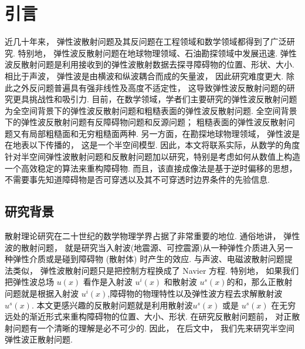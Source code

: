 \chapter{引言}\label{chap:introduction}
近几十年来， 弹性波散射问题及其反问题在工程领域和数学领域都得到了广泛研究\cite{landau}.  特别地， 弹性波反散射问题在地球物理领域、石油勘探领域中发展迅速. 
弹性波反散射问题是利用接收到的弹性波散射数据去探寻障碍物的位置、形状、大小.  相比于声波， 弹性波是由横波和纵波耦合而成的矢量波， 因此研究难度更大.  除此之外反问题普遍具有强非线性及高度不适定性， 这导致弹性波反散射问题的研究更具挑战性和吸引力. 目前，在数学领域，学者们主要研究的弹性波反散射问题为全空间背景下的弹性波反散射问题\cite{bonnet2005inverse,bao2018inverse}和粗糙表面的弹性波反散射问题\cite{liu2019near}.  全空间背景下的弹性波反散射问题有反障碍物问题和反源问题； 粗糙表面的弹性波反散射问题又有局部粗糙面和无穷粗糙面两种. 另一方面，在勘探地球物理领域， 弹性波是在地表以下传播的， 这是一个半空间模型. 因此，本文将联系实际，从数学的角度针对半空间弹性波散射问题和反散射问题加以研究，特别是考虑如何从数值上构造一个高效稳定的算法来重构障碍物.  而且，该直接成像法是基于逆时偏移的思想，不需要事先知道障碍物是否可穿透以及其不可穿透时边界条件的先验信息. 
\section{研究背景}
 散射理论研究在二十世纪的数学物理学界占据了非常重要的地位. 通俗地讲， 弹性波的散射问题， 就是研究当入射波(地震源、可控震源)从一种弹性介质进入另一种弹性介质或是碰到障碍物 (散射体) 时产生的效应.  与声波、电磁波散射问题提法类似， 弹性波散射问题只是把控制方程换成了 Navier 方程. 特别地， 如果我们把弹性波总场 $u(x)$ 看作是入射波 $u^i(x)$ 和散射波 $u^s(x)$的和，那么正散射问题就是根据入射波 $u^i(x)$,障碍物的物理特性以及弹性波方程去求解散射波 $u^s(x)$.  本文更感兴趣的反散射问题就是利用散射波$u^s(x)$ 或是 $u^s(x)$ 在无穷远处的渐近形式来重构障碍物的位置、大小、形状. 在研究反散射问题前， 对正散射问题有一个清晰的理解是必不可少的. 因此， 在后文中， 我们先来研究半空间弹性波正散射问题. 
